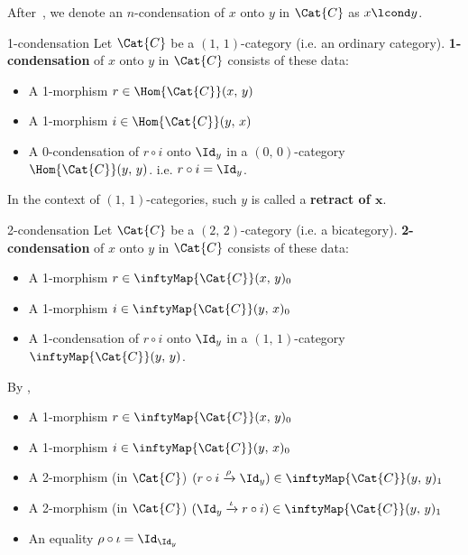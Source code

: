 \documentclass[TQFT_main]{subfiles}
\begin{document}
After~\cite{gaiotto2025condensationshighercategories}, we denote an $n$-condensation of $x$ onto $y$ in $\Cat{C}$ as $x \lcond y$.

\begin{myexample}[label=def:1-cond]{1-condensation}
    Let $\Cat{C}$ be a $(1,\, 1)$-category (i.e. an ordinary category).
    \textbf{1-condensation} of $x$ onto $y$ in $\Cat{C}$ consists of these data:
    \begin{itemize}
        \item A 1-morphism $r \in \Hom{\Cat{C}} (x,\, y)$
        \item A 1-morphism $i \in \Hom{\Cat{C}} (y,\, x)$
        \item A 0-condensation of $r \circ i$ onto $\Id_y$ in a $(0,\, 0)$-category $\Hom{\Cat{C}} (y,\, y)$. 
        i.e. $r \circ i = \Id_y$.
    \end{itemize}
    In the context of $(1,\, 1)$-categories, such $y$ is called a \textbf{retract of $\bm{x}$}.
\end{myexample}

\begin{myexample}[label=def:2-cond]{2-condensation}
    Let $\Cat{C}$ be a $(2,\, 2)$-category (i.e. a bicategory).
    \textbf{2-condensation} of $x$ onto $y$ in $\Cat{C}$ consists of these data:
    \begin{itemize}
        \item A 1-morphism $r \in \inftyMap{\Cat{C}} (x,\, y)_0$
        \item A 1-morphism $i \in \inftyMap{\Cat{C}} (y,\, x)_0$
        \item A 1-condensation of $r \circ i$ onto $\Id_y$ in a $(1,\, 1)$-category $\inftyMap{\Cat{C}} (y,\, y)$.
    \end{itemize}
    By , 
    \begin{itemize}
        \item A 1-morphism $r \in \inftyMap{\Cat{C}} (x,\, y)_0$
        \item A 1-morphism $i \in \inftyMap{\Cat{C}} (y,\, x)_0$
        \item A 2-morphism (in $\Cat{C}$) $(r \circ i \xrightarrow{\rho} \Id_y) \in \inftyMap{\Cat{C}} (y,\, y)_1$
        \item A 2-morphism (in $\Cat{C}$) $(\Id_y \xrightarrow{\iota} r \circ i) \in \inftyMap{\Cat{C}} (y,\, y)_1$
        \item An equality $\rho \circ \iota = \Id_{\Id_y}$
    \end{itemize}
\end{myexample}
\end{document}
